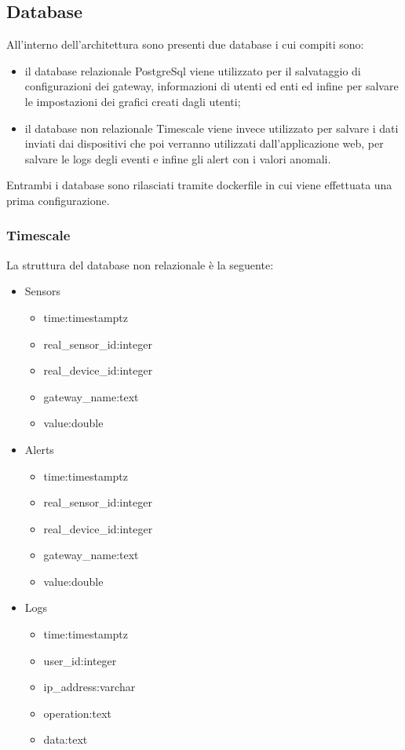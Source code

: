 \subsection{Database}
All'interno dell'architettura sono presenti due database i cui compiti sono:
\begin{itemize}
	\item il database relazionale PostgreSql viene utilizzato per il salvataggio di configurazioni dei gateway, informazioni di utenti ed enti ed infine per salvare le impostazioni dei grafici creati dagli utenti;
	\item il database non relazionale Timescale viene invece utilizzato per salvare i dati inviati dai dispositivi che poi verranno utilizzati dall'applicazione web, per salvare le logs degli eventi e infine gli alert con i valori anomali. 
\end{itemize}
Entrambi i database sono rilasciati tramite dockerfile in cui viene effettuata una prima configurazione.
\subsubsection{Timescale}
La struttura del database non relazionale è la seguente:
\begin{itemize}
	\item Sensors
	\begin{itemize}
		\item time:timestamptz
		\item real\_sensor\_id:integer
		\item real\_device\_id:integer
		\item gateway\_name:text
		\item value:double
	\end{itemize}
	\item Alerts
	\begin{itemize}
		\item time:timestamptz
		\item real\_sensor\_id:integer
		\item real\_device\_id:integer
		\item gateway\_name:text
		\item value:double
	\end{itemize}
	\item Logs
	\begin{itemize}
		\item time:timestamptz
		\item user\_id:integer
		\item ip\_address:varchar
		\item operation:text
		\item data:text
	\end{itemize}
\end{itemize}

